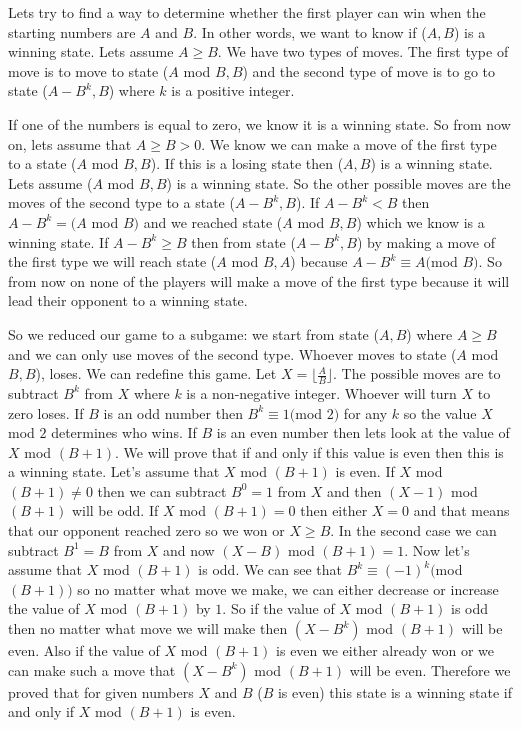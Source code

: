 

Lets try to find a way to determine whether the first player can win when the starting numbers are $A$ and $B$.
In other words, we want to know if ($A,B$) is a winning state.
Lets assume $A \geqslant B$.
We have two types of moves.
The first type of move is to move to state ($A$ mod $B, B$)
	and the second type of move is to go to state ($A - B^k, B$) where $k$ is a positive integer. 

\bigskip

If one of the numbers is equal to zero, we know it is a winning state.
So from now on, lets assume that $A \geqslant B > 0$.
We know we can make a move of the first type to a state ($A$ mod $B,B$).
If this is a losing state then ($A,B$) is a winning state.
Lets assume ($A$ mod $B, B$) is a winning state.
So the other possible moves are the moves of the second type to a state ($A - B^k, B$).
If $A - B^k < B$ then $A - B^k = (A$ mod $B)$ and we reached state ($A$ mod $B, B$) which we know is a winning state.
If $A - B^k \geqslant B$ then from state ($A - B^k, B$)
	by making a move of the first type we will reach state ($A$ mod $B, A$)
	because $A - B^k \equiv A ($mod $B)$.
So from now on none of the players will make a move of the first type because it will lead their opponent to a winning state. 

\bigskip

So we reduced our game to a subgame: we start from state ($A,B$)
	where $A \geqslant B$ and we can only use moves of the second type. 
Whoever moves to state ($A$ mod $B, B$), loses.
We can redefine this game.
Let $X = \lfloor \frac{A}{B} \rfloor$.
The possible moves are to subtract $B^k$ from $X$ where $k$ is a non-negative integer.
Whoever will turn $X$ to zero loses.
If $B$ is an odd number then $B^k \equiv 1 ($mod $2)$ for any $k$ so the value $X$ mod $2$ determines who wins.
If $B$ is an even number then lets look at the value of $X$ mod $(B + 1)$.
We will prove that if and only if this value is even then this is a winning state.
Let's assume that $X$ mod $(B+1)$ is even.
If $X$ mod $(B+1) \neq 0$ then we can subtract $B^0 = 1$ from $X$ and then $(X-1)$ mod $(B+1)$ will be odd.
If $X$ mod $(B+1) = 0$ then either $X = 0$ and that means that our opponent reached zero so we won or $X \geqslant B$.
In the second case we can subtract $B^1 = B$ from $X$ and now $(X - B)$ mod $(B+1) = 1$.
Now let's assume that $X$ mod $(B+1)$ is odd.
We can see that $B^k \equiv (-1)^k ($mod $(B+1))$ so no matter what move we make,
	we can either decrease or increase the value of $X$ mod $(B+1)$ by $1$.
So if the value of $X$ mod $(B+1)$ is odd then no matter what move we will make then $(X - B^k)$ mod $(B+1)$ will be even.
Also if the value of $X$ mod $(B+1)$ is even we either already won or we can make such a move
	that $(X - B^k)$ mod $(B+1)$ will be even.
Therefore we proved that for given numbers $X$ and $B$ ($B$ is even)
	this state is a winning state if and only if $X$ mod $(B+1)$ is even.


